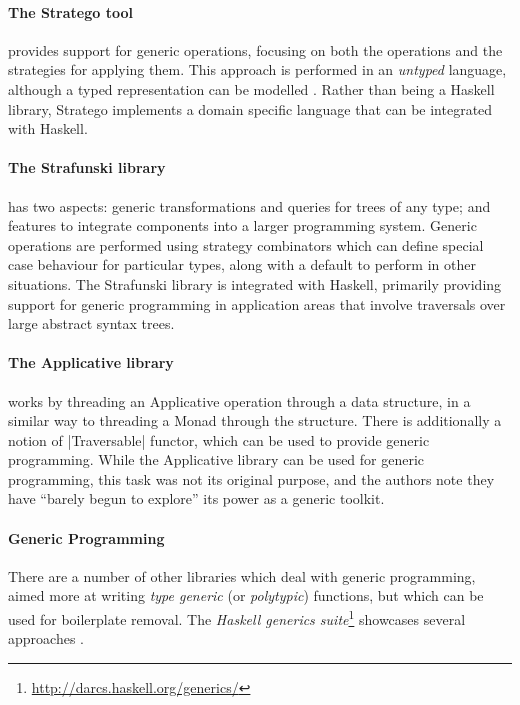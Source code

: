 \documentclass[preprint]{sigplanconf}
\let\cite=\citep
\begin{document}
\paragraph{The Stratego tool} \citep{stratego} provides support for generic operations, focusing on both the operations and the strategies for applying them. This approach is performed in an \textit{untyped} language, although a typed representation can be modelled \cite{lammel:typed_generic_strategies}. Rather than being a Haskell library, Stratego implements a domain specific language that can be integrated with Haskell.

\paragraph{The Strafunski library} \citep{strafunski, lammel:polymorphic_symphony} has two aspects: generic transformations and queries for trees of any type; and features to integrate components into a larger programming system. Generic operations are performed using strategy combinators which can define special case behaviour for particular types, along with a default to perform in other situations. The Strafunski library is integrated with Haskell, primarily providing support for generic programming in application areas that involve traversals over large abstract syntax trees.

\paragraph{The Applicative library} \citep{mcbride:applicative} works by threading an Applicative operation through a data structure, in a similar way to threading a Monad through the structure. There is additionally a notion of |Traversable| functor, which can be used to provide generic programming. While the Applicative library can be used for generic programming, this task was not its original purpose, and the authors note they have ``barely begun to explore'' its power as a generic toolkit.

\paragraph{Generic Programming} There are a number of other libraries which deal with generic programming, aimed more at writing \textit{type generic} (or \textit{polytypic}) functions, but which can be used for boilerplate removal. The \textit{Haskell generics suite}\footnote{\url{http://darcs.haskell.org/generics/}} showcases several approaches \citep{weirich:replib,hinze:generics_masses,oleg:smash,hinze:generic_haskell}.
\end{document}
